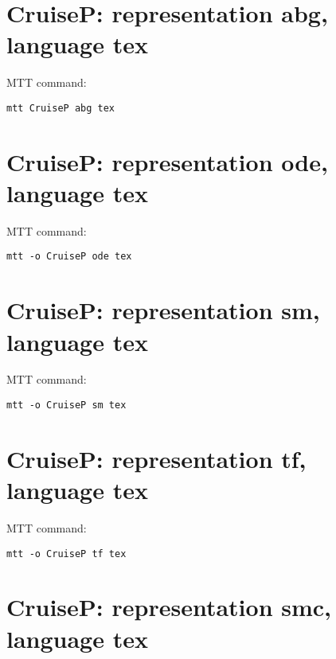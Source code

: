 

\section{\textbf{CruiseP}: representation \textbf{abg}, language \textbf{tex}}
\label{sec:CruiseP_abg.tex}


MTT command:
\begin{verbatim}
mtt CruiseP abg tex 
\end{verbatim}
  


\section{\textbf{CruiseP}: representation \textbf{ode}, language \textbf{tex}}
\label{sec:CruiseP_ode.tex}


MTT command:
\begin{verbatim}
mtt -o CruiseP ode tex 
\end{verbatim}
  


\section{\textbf{CruiseP}: representation \textbf{sm}, language \textbf{tex}}
\label{sec:CruiseP_sm.tex}


MTT command:
\begin{verbatim}
mtt -o CruiseP sm tex 
\end{verbatim}
  


\section{\textbf{CruiseP}: representation \textbf{tf}, language \textbf{tex}}
\label{sec:CruiseP_tf.tex}


MTT command:
\begin{verbatim}
mtt -o CruiseP tf tex 
\end{verbatim}
  


\section{\textbf{CruiseP}: representation \textbf{smc}, language \textbf{tex}}
\label{sec:CruiseP_smc.tex}


